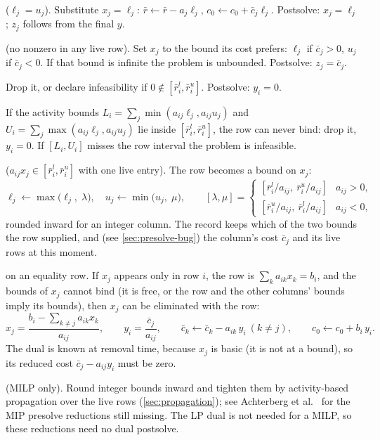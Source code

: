 \begin{description}[style=nextline,leftmargin=1.2em,font=\sffamily\bfseries\color{navy}]
\item[Fixed column] ($\ell_j=u_j$). Substitute $x_j=\ell_j$: $\bar r\leftarrow \bar r - a_j\ell_j$,
  $c_0\leftarrow c_0+\bar c_j\ell_j$. Postsolve: $x_j=\ell_j$; $z_j$ follows from the final $y$.
\item[Empty column] (no nonzero in any live row). Set $x_j$ to the bound its cost prefers:
  $\ell_j$ if $\bar c_j>0$, $u_j$ if $\bar c_j<0$. If that bound is infinite the problem is
  unbounded. Postsolve: $z_j=\bar c_j$.
\item[Empty row] Drop it, or declare infeasibility if $0\notin[\bar r^l_i,\bar r^u_i]$. Postsolve: $y_i=0$.
\item[Redundant row] If the activity bounds $L_i=\sum_j \min(a_{ij}\ell_j,a_{ij}u_j)$ and
  $U_i=\sum_j\max(a_{ij}\ell_j,a_{ij}u_j)$ lie inside $[\bar r^l_i,\bar r^u_i]$, the row can never
  bind: drop it, $y_i=0$. If $[L_i,U_i]$ misses the row interval the problem is infeasible.
\item[Singleton row] ($a_{ij}x_j\in[\bar r^l_i,\bar r^u_i]$ with one live entry). The row becomes
  a bound on $x_j$:
  \begin{equation}\label{eq:singleton-bound}
     \ell_j \leftarrow \max\bigl(\ell_j,\; \lambda\bigr),\quad u_j\leftarrow \min\bigl(u_j,\;\mu\bigr),\qquad
     [\lambda,\mu] = \begin{cases} [\bar r^l_i/a_{ij},\ \bar r^u_i/a_{ij}] & a_{ij}>0,\\
                                   [\bar r^u_i/a_{ij},\ \bar r^l_i/a_{ij}] & a_{ij}<0,\end{cases}
  \end{equation}
  rounded inward for an integer column. The record keeps which of the two bounds the row
  supplied, and (see \cref{sec:presolve-bug}) the column's cost $\bar c_j$ and its live rows at this moment.
\item[Free column singleton] on an equality row. If $x_j$ appears only in row $i$, the row is
  $\sum_k a_{ik}x_k = b_i$, and the bounds of $x_j$ cannot bind (it is free, or the row and the
  other columns' bounds imply its bounds), then $x_j$ can be eliminated with the row:
  \begin{equation}\label{eq:free-singleton}
    x_j = \frac{b_i-\sum_{k\ne j}a_{ik}x_k}{a_{ij}},\qquad
    y_i = \frac{\bar c_j}{a_{ij}},\qquad
    \bar c_k \leftarrow \bar c_k - a_{ik}\,y_i\ (k\ne j),\qquad c_0\leftarrow c_0 + b_i\,y_i .
  \end{equation}
  The dual is known at removal time, because $x_j$ is basic (it is not at a bound), so its reduced
  cost $\bar c_j - a_{ij}y_i$ must be zero.
\item[Integer bounds] (MILP only). Round integer bounds inward and tighten them by
  activity-based propagation over the live rows (\cref{sec:propagation}); see
  Achterberg et al.~\cite{achterberg2020} for the MIP presolve reductions still missing. The LP dual is not needed
  for a MILP, so these reductions need no dual postsolve.
\end{description}

